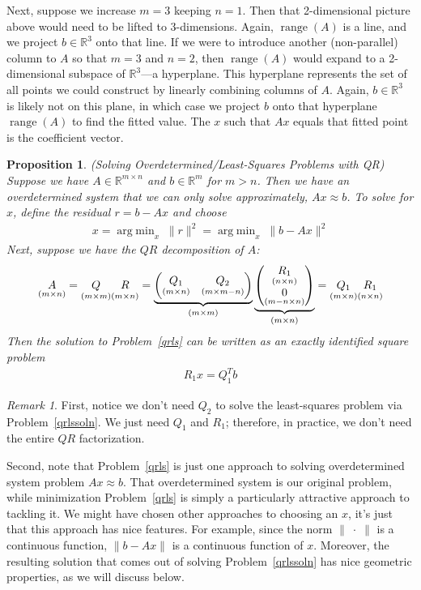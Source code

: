 \documentclass[12pt]{article}
\numberwithin{equation}{section} %
\theoremstyle{plain}
\newtheorem{prop}[thm]{Proposition}
\theoremstyle{definition}
\theoremstyle{remark}
\newtheorem*{rmk}{Remark}
\newcommand{\R}{\mathbb{R}}
\newcommand{\Rm}{\mathbb{R}^m}
\newcommand{\Rmn}{\mathbb{R}^{m\times n}}
\DeclareMathOperator*{\argmin}{arg\;min}
\newcommand{\range}{\operatorname{range}}
\begin{document}
Next, suppose we increase $m=3$ keeping $n=1$. Then that 2-dimensional
picture above would need to be lifted to 3-dimensions. Again,
$\range(A)$ is a line, and we project $b\in\R^3$ onto that line. If we
were to introduce another (non-parallel) column to $A$ so that $m=3$ and
$n=2$, then $\range(A)$ would expand to a 2-dimensional subspace of
$\R^3$---a hyperplane. This hyperplane represents the set of all points
we could construct by linearly combining columns of $A$. Again,
$b\in\R^3$ is likely not on this plane, in which case we project $b$
onto that hyperplane $\range(A)$ to find the fitted value. The $x$ such
that $Ax$ equals that fitted point is the coefficient vector.

\clearpage
\begin{prop}
\emph{(Solving Overdetermined/Least-Squares Problems with QR)}
Suppose we have $A\in\Rmn$ and $b\in\Rm$ for $m>n$.
Then we have an overdetermined system that we can only solve
approximately, $Ax\approx b$. To solve for $x$,
define the residual $r=b-Ax$ and choose
\begin{align}
  x = \argmin_x \;\lVert r\rVert^2 =
  \argmin_x \;\lVert b-Ax\rVert^2
  \label{qrls}
\end{align}
Next, suppose we have the $QR$ decomposition of $A$:
\begin{align*}
  \underset{(m\times n)}{A}
  =
  \underset{(m\times m)}{Q}
  \underset{(m\times n)}{R\vphantom{Q}}
  =
  \underbrace{%
    \begin{pmatrix}
      \underset{(m\times n)}{Q_1}
      & \underset{(m\times m-n)}{Q_2}
    \end{pmatrix}
  }_{(m\times m)}
  \underbrace{%
    \begin{pmatrix}
      \underset{(n\times n)}{R_1}
      \\
      \underset{(m-n\times n)}{0}
    \end{pmatrix}
  }_{(m\times n)}
  =
  \underset{(m\times n)}{Q_1}
  \underset{(n\times n)}{R_1\vphantom{Q_1}}
\end{align*}
Then the solution to Problem~\ref{qrls} can be written as an exactly
identified square problem
\begin{align}
  R_1 x = Q_1^T b
  \label{qrlssoln}
\end{align}
\end{prop}
\begin{rmk}
First, notice we don't need $Q_2$ to solve the least-squares problem via
Problem~\ref{qrlssoln}. We just need $Q_1$ and $R_1$; therefore, in
practice, we don't need the entire $QR$ factorization.

Second, note that Problem~\ref{qrls} is just one approach to solving
overdetermined system problem $Ax\approx b$. That overdetermined system
is our original problem, while minimization Problem~\ref{qrls} is simply
a particularly attractive approach to tackling it. We might have chosen
other approaches to choosing an $x$, it's just that this approach has
nice features. For example, since the norm $\lVert\;\cdot\;\rVert$ is a
continuous function, $\lVert b-Ax\lVert$ is a continuous function of
$x$. Moreover, the resulting solution that comes out of solving
Problem~\ref{qrlssoln} has nice geometric properties, as we will discuss
below.
\end{rmk}
\end{document}
